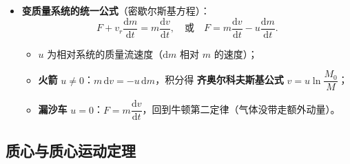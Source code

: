 \documentclass[12pt,a4paper]{ctexart}
\begin{document}
\begin{itemize}
    \item \textbf{变质量系统的统一公式}（密歇尔斯基方程）：
    \[
        F + v_r\frac{\mathrm{d}m}{\mathrm{d}t} = m\frac{\mathrm{d}v}{\mathrm{d}t},\quad
        \text{或}\quad F = m\frac{\mathrm{d}v}{\mathrm{d}t} - u\frac{\mathrm{d}m}{\mathrm{d}t}.
    \]
    \begin{itemize}
        \item $u$ 为相对系统的质量流速度（$\mathrm{d}m$ 相对 $m$ 的速度）；
        \item \textbf{火箭} $u \ne 0$：$m\,\mathrm{d}v = -u\,\mathrm{d}m$，积分得 \textbf{齐奥尔科夫斯基公式} $v = u\ln\dfrac{M_0}{M}$；
        \item \textbf{漏沙车} $u = 0$：$F = m\dfrac{\mathrm{d}v}{\mathrm{d}t}$，回到牛顿第二定律（气体没带走额外动量）。
    \end{itemize}
\end{itemize}

\subsection{质心与质心运动定理}
\end{document}
